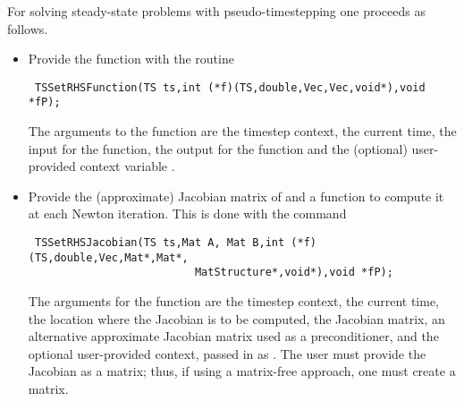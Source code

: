 For solving steady-state problems with pseudo-timestepping one proceeds 
as follows.
\begin{itemize}
\item Provide the function  with the routine
\begin{verbatim}
 TSSetRHSFunction(TS ts,int (*f)(TS,double,Vec,Vec,void*),void *fP);
\end{verbatim}
The  arguments to the function  are
the timestep context, the current time, the input for the function,
the output for the function and the (optional) user-provided context
variable .

\item Provide the (approximate) Jacobian matrix of  and a 
function to compute it at each Newton iteration. This is done with the command
\begin{verbatim}
 TSSetRHSJacobian(TS ts,Mat A, Mat B,int (*f)(TS,double,Vec,Mat*,Mat*,
                          MatStructure*,void*),void *fP);
\end{verbatim}
The  arguments for the function  are
the timestep context, the current time, the location where the
Jacobian is to be computed, the Jacobian matrix, an alternative
approximate Jacobian matrix used as a preconditioner, and the optional
user-provided context, passed in as . The user must provide the 
Jacobian as a matrix; thus, if using a matrix-free approach, one 
must create a  matrix.
\end{itemize}

